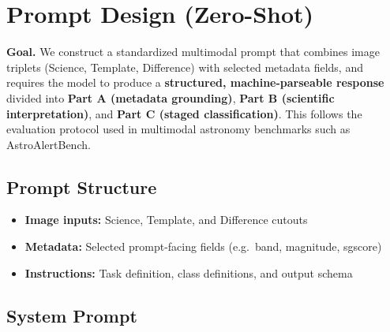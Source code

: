 \documentclass[11pt,a4paper]{article}
\begin{document}
\section{Prompt Design (Zero-Shot)}

\noindent\textbf{Goal.} We construct a standardized multimodal prompt that combines image triplets (Science, Template, Difference) with selected metadata fields, and requires the model to produce a \textbf{structured, machine-parseable response} divided into \textbf{Part A (metadata grounding)}, \textbf{Part B (scientific interpretation)}, and \textbf{Part C (staged classification)}. This follows the evaluation protocol used in multimodal astronomy benchmarks such as AstroAlertBench.

\subsection{Prompt Structure}

\begin{itemize}[leftmargin=*]
  \item \textbf{Image inputs:} Science, Template, and Difference cutouts
  \item \textbf{Metadata:} Selected prompt-facing fields (e.g.\ band, magnitude, sgscore)
  \item \textbf{Instructions:} Task definition, class definitions, and output schema
\end{itemize}

\subsection{System Prompt}
\end{document}
